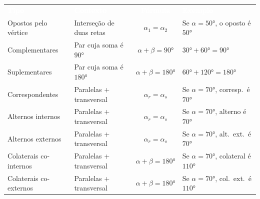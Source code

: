 \documentclass[12pt]{article}
\begin{document}
\vspace{6pt}
\begin{center}
\setlength{\tabcolsep}{8pt}\renewcommand{\arraystretch}{1.3}\small
\begin{tabular}{llcl}
\rowcolor{darkblue}
\textcolor{white}{\textbf{Tipo}} & \textcolor{white}{\textbf{Contexto}} &
\textcolor{white}{\textbf{Fórmula}} & \textcolor{white}{\textbf{Exemplo}}\\
Opostos pelo vértice   & Interseção de duas retas   & $\alpha_1 = \alpha_2$      & Se $\alpha=50°$, o oposto é $50°$\\
\rowcolor{exbg}
Complementares         & Par cuja soma é $90°$      & $\alpha + \beta = 90°$     & $30° + 60° = 90°$\\
Suplementares          & Par cuja soma é $180°$     & $\alpha + \beta = 180°$    & $60° + 120° = 180°$\\
\rowcolor{exbg}
Correspondentes        & Paralelas + transversal    & $\alpha_r = \alpha_s$      & Se $\alpha=70°$, corresp.\ é $70°$\\
Alternos internos      & Paralelas + transversal    & $\alpha_r = \alpha_s$      & Se $\alpha=70°$, alterno é $70°$\\
\rowcolor{exbg}
Alternos externos      & Paralelas + transversal    & $\alpha_r = \alpha_s$      & Se $\alpha=70°$, alt.\ ext.\ é $70°$\\
Colaterais co-internos & Paralelas + transversal    & $\alpha + \beta = 180°$    & Se $\alpha=70°$, colateral é $110°$\\
\rowcolor{exbg}
Colaterais co-externos & Paralelas + transversal    & $\alpha + \beta = 180°$    & Se $\alpha=70°$, col.\ ext.\ é $110°$\\
\end{tabular}
\end{center}
\end{document}
